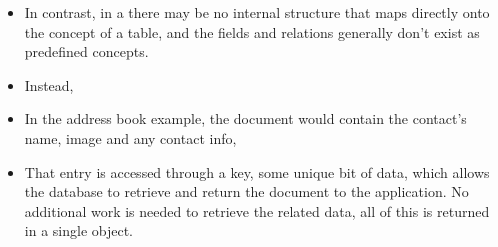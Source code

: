 \begin{itemize}
\item
In contrast, in a  there may be no internal
structure that maps directly onto the concept of a table, and the fields
and relations generally don't exist as predefined concepts.

\item
Instead, 
\item
In the address book example, the document
would contain the contact's name, image and any contact info, 

\item
That entry is accessed through a key, some unique bit of
data, which allows the database to retrieve and return the document to
the application. No additional work is needed to retrieve the related
data, all of this is returned in a single object.


\end{itemize}
